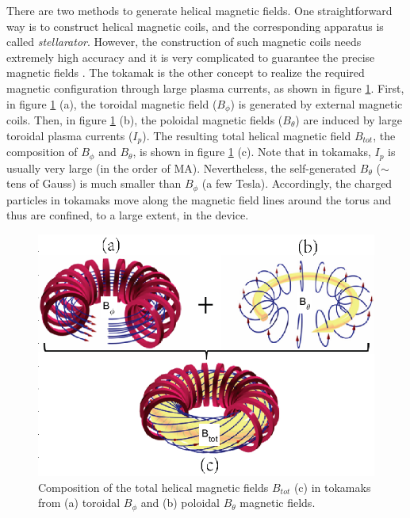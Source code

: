 There are two methods to generate helical magnetic fields. One straightforward way is to construct helical magnetic coils, and the corresponding apparatus is called \emph{stellarator}. However, the construction of such magnetic coils needs extremely high accuracy and it is very complicated to guarantee the precise magnetic fields \cite{Motojima_2000_NF_LHD}. The tokamak is the other concept to realize the required magnetic configuration through large plasma currents, as shown in figure \ref{fig:magnetic_field}. First, in figure \ref{fig:magnetic_field} (a), the toroidal magnetic field ($B_{\phi}$) is generated by external magnetic coils. Then, in figure \ref{fig:magnetic_field} (b), the poloidal magnetic fields ($B_{\theta}$) are induced by large toroidal plasma currents ($I_p$). The resulting total helical magnetic field $B_{tot}$, the composition of $B_{\phi}$ and $B_{\theta}$, is shown in figure \ref{fig:magnetic_field} (c). Note that in tokamaks, $I_p$ is usually very large (in the order of MA). Nevertheless, the self-generated $B_{\theta}$ ($\sim$ tens of Gauss) is much smaller than $B_{\phi}$ (a few Tesla). Accordingly, the charged particles in tokamaks move along the magnetic field lines around the torus and thus are confined, to a large extent, in the device.


\begin{figure}[h]
\begin{centering}
\includegraphics[scale=0.7]{B.png}
\par\end{centering}
\caption{Composition of the total helical magnetic fields $B_{tot}$ (c) in tokamaks from (a) toroidal $B_{\phi}$  and (b) poloidal $B_{\theta}$ magnetic fields.}
\label{fig:magnetic_field}
\end{figure}

